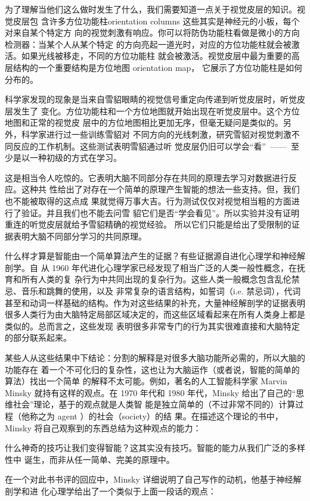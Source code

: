 为了理解当他们这么做时发生了什么，我们需要知道一点关于视觉皮层的知识。视觉皮层包
含许多方位功能柱orientation columns 这些其实是神经元的小板，每个对来自某个特定方
向的视觉刺激有响应。你可以将防伪功能柱看做是微小的方向检测器：当某个人从某个特定
的方向亮起一道光时，对应的方位功能柱就会被激活。如果光线被移走，不同的方位功能柱
就会被激活。视觉皮层中最为重要的高层结构的一个重要结构是方位地图 orientation map，
它展示了方位功能柱是如何分布的。

科学家发现的现象是当来自雪貂眼睛的视觉信号重定向传递到听觉皮层时，听觉皮层发生了
变化。方位功能柱和一个方位地图就开始出现在听觉皮层中。这个方位地图和正常的视觉皮
层中的方位地图相比更加无序，但毫无疑问是类似的。另外，科学家进行过一些训练雪貂对
不同方向的光线刺激，研究雪貂对视觉刺激不同反应的工作机制。这些测试表明雪貂通过听
觉皮层仍旧可以学会“看”~——~至少是以一种初级的方式在学习。

这是相当令人吃惊的。它表明大脑不同部分存在共同的原理去学习对数据进行反应。这种共
性给出了对存在一个简单的原理产生智能的想法一些支持。但，我们也不能被取得的这点成
果就觉得万事大吉。行为测试仅仅对视觉相当粗的方面进行了验证。并且我们也不能去问雪
貂它们是否“学会看见”。所以实验并没有证明重连的听觉皮层就给予雪貂精确的视觉经验。
所以它们只能是给出了受限制的证据表明大脑不同部分学习的共同原理。

什么样才算是智能由一个简单算法产生的证据？有些证据源自进化心理学和神经解剖学。自
从 1960 年代进化心理学家已经发现了相当广泛的人类一般性概念，在抚育和所有人类的复
杂行为中共同出现的复杂行为。这些人类一般概念包含乱伦禁忌、音乐和跳舞的使用，以及
非常复杂的语言结构，如誓词（i.e. 禁忌词），代词甚至和动词一样基础的结构。作为对这些结果的补充，大量神经解剖学的证据表明很多人类行为由大脑特定局部区域决定的，而这些区域看起来在所有人类身上都是类似的。总而言之，这些发现
表明很多非常专门的行为其实很难直接和大脑特定的部分联系起来。

某些人从这些结果中下结论：分割的解释是对很多大脑功能所必需的，所以大脑的功能存在
着一个不可化归的复杂性，这也让为大脑运作（或者说，智能的简单的算法）找出一个简单
的解释不太可能。例如，著名的人工智能科学家 Marvin Minsky 就持有这样的观点。在
1970 年代和 1980 年代，Minsky 给出了自己的“思维社会”理论，基于的观点就是人类智
能是独立简单的（不过非常不同的）计算过程（他称之为 agent ）的社会（society）的结
果。在描述这个理论的书中，Minsky 将自己观察到的东西总结为这种观点的能力：

    什么神奇的技巧让我们变得智能？这其实没有技巧。智能的能力从我们广泛的多样性中
    诞生，而非从任一简单、完美的原理中。

在一个对此书书评的回应中，Minsky 详细说明了自己写作的动机，他基于神经解剖学和进
化心理学给出了一个类似于上面一段话的观点：

